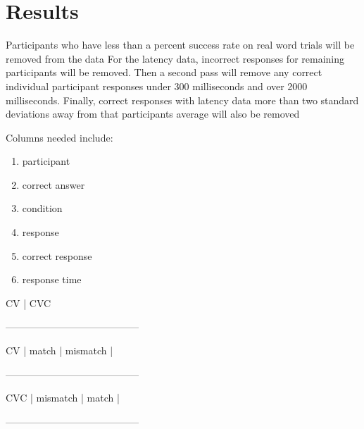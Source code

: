 \section{Results}

Participants who have less than a %
percent success rate on real word trials will be removed from the data %
For the latency data, incorrect responses for remaining participants will be removed. Then a second pass will remove any correct individual participant responses under 300 milliseconds and over 2000 milliseconds. Finally, correct responses with latency data more than two standard deviations away from that participants average will also be removed %


Columns needed include:
\begin{enumerate}
\item{participant}
\item{correct answer}
\item{condition}
\item{response}
\item{correct response}
\item{response time}
\end{enumerate}

		CV	   |	CVC	
			
-----------------------------------------

CV	|     match	   |  mismatch |

-----------------------------------------

CVC |  mismatch |     match    |

-----------------------------------------



